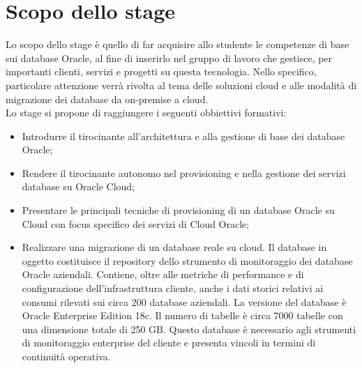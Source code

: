 \section*{Scopo dello stage}
Lo scopo dello stage è quello di far acquisire allo studente le competenze di base sui database Oracle, al fine di inserirlo nel gruppo di lavoro che gestisce, per importanti clienti, servizi e progetti su questa tecnologia. 
Nello specifico, particolare attenzione verrà rivolta al tema delle soluzioni cloud e alle modalità di migrazione dei database da on-premise a cloud. \\

Lo stage si propone di raggiungere i seguenti obbiettivi formativi:

\begin{itemize}
    \item Introdurre il tirocinante all'architettura e alla gestione di base dei database Oracle;
    \item Rendere il tirocinante autonomo nel provisioning e nella gestione dei servizi database su Oracle Cloud;
    \item Presentare le principali tecniche di provisioning di un database Oracle su Cloud con focus specifico dei servizi di Cloud Oracle;
    \item Realizzare una migrazione di un database reale su cloud. Il database in oggetto costituisce il repository dello strumento di monitoraggio dei database Oracle aziendali. Contiene, oltre alle metriche di performance e di configurazione dell'infrastruttura cliente, anche i dati storici relativi ai consumi rilevati sui circa 200 database aziendali.
    La versione del database è Oracle Enterprise Edition 18c. Il numero di tabelle è circa 7000 tabelle con una dimensione totale di 250 GB. Questo database è necessario agli strumenti di monitoraggio enterprise del cliente e presenta vincoli in termini di continuità operativa.
\end{itemize}